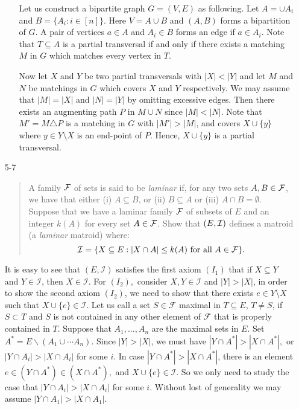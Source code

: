 \documentclass[12pt]{article}
\begin{document}
\begin{enumerate}
\begin{itemize}
Let us construct a bipartite graph $G=(V, E)$ as following. Let $A = \cup A_i$ and $B = \{A_i: i \in [n]\}$. Here $V = A \cup B$ and $(A, B)$ forms a bipartition of $G$. A pair of vertices $a \in A$ and $A_i \in B$ forms an edge if $a \in A_i$. Note that $T \subseteq A$ is a partial transversal if and only if there exists a matching $M$ in $G$ which matches every vertex in $T$.

Now let $X$ and $Y$ be two partial transversals with $|X| < |Y|$ and let $M$ and $N$ be matchings in $G$ which covers $X$ and $Y$ respectively. We may assume that $|M| = |X|$ and $|N| = |Y|$ by omitting excessive edges. Then there exists an augmenting path $P$ in $M \cup N$ since $|M| < |N|$. Note that $M' = M \triangle P$ is a matching in $G$ with $|M'| > |M|$, and covers $X \cup \{y\}$ where $y \in Y \setminus X$ is an end-point of $P$. Hence, $X \cup\{y\}$ is a partial transversal.
\end{itemize}

\item[5-7]

\begin{quote}
A family ${\cal F}$ of sets is said to be {\it laminar} if, for any
two sets $A, B\in {\cal F}$, we have that either (i) $A\subseteq B$,
or (ii) $B\subseteq A$ or (iii) $A\cap B=\emptyset$. Suppose that we
have a laminar family ${\cal F}$ of subsets of $E$ and an integer $k(A)$ for
every set $A\in {\cal F}$. Show that $(E, {\cal I})$ defines a matroid
(a {\it laminar} matroid) where:
$${\cal I} =\{X\subseteq E: |X\cap A|\leq k(A) \mbox{ for all } A \in
{\cal F}\}.$$
\end{quote}

It is easy to see that $(E,\mathcal{I})$ satisfies the first axiom
$(I_1)$ that if $X\subseteq Y$ and $Y \in \mathcal{I}$, then $X \in
\mathcal{I}.$ For $(I_2),$ consider $X,Y \in \mathcal{I}$ and $|Y|>|X|$, in
order to show the second axiom $(I_2)$, we need to show that there
exists $e \in Y\setminus X$ such that $X \cup \{e\} \in \mathcal{I}.$ Let us call
a set $S \in \mathcal{F}$ maximal in $T \subseteq E$, $T\neq S$, if
$S\subset T$ and $S$ is not contained in any other element of
$\mathcal{F}$ that is properly contained in $T.$ Suppose that
$A_1,\ldots, A_n $ are the maximal sets in $E.$ Set $A^{*}=E
\backslash(A_1\cup \cdots A_n).$ Since $|Y|>|X|$, we must have
$|Y\cap A^{*}|>|X\cap A^{*}|,$ or $|Y\cap A_i|>|X\cap A_i|$ for some
$i.$ In case $|Y\cap A^{*}|>|X\cap A^{*}|$, there is an element $e
\in (Y\cap A^{*})\in (X\cap A^{*}),$ and $X \cup \{e\} \in \mathcal{I}.$
So we only need to study the case that $|Y\cap A_i|>|X\cap A_i|$ for
some $i.$ Without lost of generality we may assume $|Y\cap
A_1|>|X\cap A_1|.$


\end{enumerate}
\end{document}
